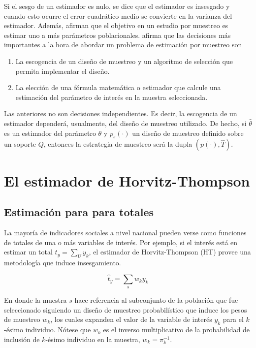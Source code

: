 \documentclass[
  10pt,
  spanish,
]{book}
\providecommand{\tightlist}{%
  \setlength{\itemsep}{0pt}\setlength{\parskip}{0pt}}
\begin{document}
Si el sesgo de un estimador es nulo, se dice que el estimador es insesgado y cuando esto ocurre el error cuadrático medio se convierte en la varianza del estimador. Además, \citet{Sarndal_Swensson_Wretman_2003} afirman que el objetivo en un estudio por muestreo es estimar uno a más parámetros poblacionales. \citet{Gutierrez_2016} afirma que las decisiones más importantes a la hora de abordar un problema de estimación por muestreo son

\begin{enumerate}
\def\labelenumi{\arabic{enumi}.}
\tightlist
\item
  La escogencia de un diseño de muestreo y un algoritmo de selección que permita implementar el diseño.
\item
  La elección de una fórmula matemática o estimador que calcule una estimación del parámetro de interés en la muestra seleccionada.
\end{enumerate}

Las anteriores no son decisiones independientes. Es decir, la escogencia de un estimador dependerá, usualmente, del diseño de muestreo utilizado. De hecho, si \(\hat\theta\) es un estimador del parámetro \(\theta\) y \(p_s(\cdot)\) un diseño de muestreo definido sobre un soporte \(Q\), entonces la estrategia de muestreo será la dupla \((p(\cdot),\hat{T})\).

\hypertarget{el-estimador-de-horvitz-thompson}{%
\section{El estimador de Horvitz-Thompson}\label{el-estimador-de-horvitz-thompson}}

\hypertarget{estimaciuxf3n-para-para-totales}{%
\subsection{Estimación para para totales}\label{estimaciuxf3n-para-para-totales}}

La mayoría de indicadores sociales a nivel nacional pueden verse como funciones de totales de una o más variables de interés. Por ejemplo, si el interés está en estimar un total \(t_y=\sum_U y_k\), el estimador de Horvitz-Thompson (HT) provee una metodología que induce insesgamiento.

\[
\hat{t}_y = \sum_s w_k y_k
\]

En donde la muestra \(s\) hace referencia al subconjunto de la población que fue seleccionado siguiendo un diseño de muestreo probabilístico que induce los pesos de muestreo \(w_k\), los cuales expanden el valor de la variable de interés \(y_k\) para el \(k\)-ésimo individuo. Nótese que \(w_k\) es el inverso multiplicativo de la probabilidad de inclusión de \(k\)-ésimo individuo en la muestra, \(w_k = \pi_k^{-1}\).
\end{document}
